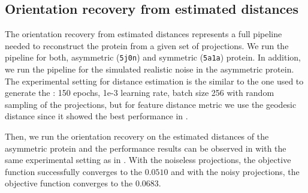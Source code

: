 \subsection{Orientation recovery from estimated distances}


The orientation recovery from estimated distances represents a full pipeline needed to reconstruct the protein from a given set of projections.
We run the pipeline for both, asymmetric (\texttt{5j0n}) and symmetric (\texttt{5a1a}) protein.
In addition, we run the pipeline for the simulated realistic noise in the asymmetric protein.
The experimental setting for distance estimation is the similar to the one used to generate the : 150 epochs, 1e-3 learning rate, batch size 256 with random sampling of the projections, but for feature distance metric we use the geodesic distance since it showed the best performance in .

Then, we run the orientation recovery on the estimated distances of the asymmetric protein and the performance results can be observed in  with the same experimental setting as in .
With the noiseless projections, the objective function successfully converges to the $0.0510$ and with the noisy projections, the objective function converges to the $0.0683$.

